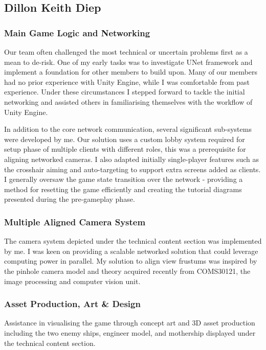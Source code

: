 \documentclass[a4paper,11pt]{article}
\begin{document}
\subsection{Dillon Keith Diep}

\subsubsection{Main Game Logic and Networking}

Our team often challenged the most technical or uncertain problems first as a mean to de-risk. One of my early tasks was to investigate UNet framework and implement a foundation for other members to build upon. Many of our members had no prior experience with Unity Engine, while I was comfortable from past experience. Under these circumstances I stepped forward to tackle the initial networking and assisted others in familiarising themselves with the workflow of Unity Engine.

In addition to the core network communication, several significant sub-systems were developed by me. Our solution uses a custom lobby system required for setup phase of multiple clients with different roles, this was a prerequisite for aligning networked cameras. I also adapted initially single-player features such as the crosshair aiming and auto-targeting to support extra screens added as clients. I generally oversaw the game state transition over the network - providing a method for resetting the game efficiently and creating the tutorial diagrams presented during the pre-gameplay phase.

\subsubsection{Multiple Aligned Camera System}

The camera system depicted under the technical content section was implemented by me. I was keen on providing a scalable networked solution that could leverage computing power in parallel.  My solution to align view frustums was inspired by the pinhole camera model and theory acquired recently from COMS30121, the image processing and computer vision unit.

\subsubsection{Asset Production, Art \& Design}

Assistance in visualising the game through concept art and 3D asset production including the two enemy ships, engineer model, and mothership displayed under the technical content section.
\end{document}
